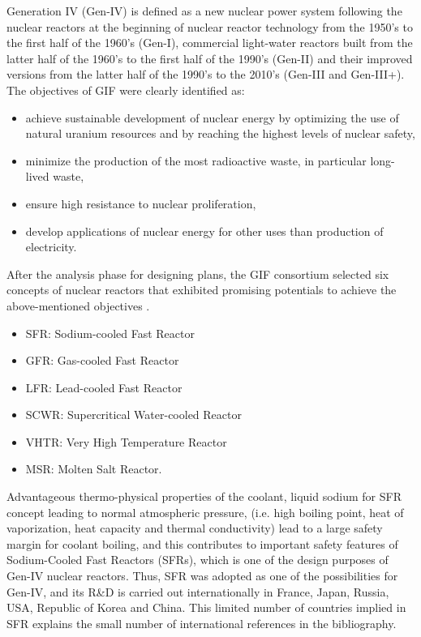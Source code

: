     Generation IV (Gen-IV) is defined as a new nuclear power system following the nuclear reactors at the beginning of nuclear reactor technology from the 1950's
to the first half of the 1960's (Gen-I), commercial light-water reactors built from the latter half of the 1960's to the first half of the 1990's (Gen-II) and their improved
versions from the latter half of the 1990's to the 2010's (Gen-III and Gen-III+). The objectives of GIF were clearly identified as:
    \begin{itemize}
     \item achieve sustainable development of nuclear energy by optimizing the use of natural uranium resources and by reaching the highest levels of nuclear safety,
     \item minimize the production of the most radioactive waste, in particular long-lived waste,
     \item ensure high resistance to nuclear proliferation,
     \item develop applications of nuclear energy for other uses than production of electricity.
    \end{itemize}
    After the analysis phase for designing plans, the GIF consortium selected six concepts of nuclear reactors that exhibited promising potentials to
achieve the above-mentioned objectives \parencite{GIF2014TechnologyRoadmapUpdate}.
    \begin{itemize}
     \item SFR: Sodium-cooled Fast Reactor
     \item GFR: Gas-cooled Fast Reactor
     \item LFR: Lead-cooled Fast Reactor
     \item SCWR: Supercritical Water-cooled Reactor
     \item VHTR: Very High Temperature Reactor
     \item MSR: Molten Salt Reactor.
    \end{itemize}
    Advantageous thermo-physical properties of the coolant, liquid sodium for SFR concept leading to normal atmospheric pressure, (i.e. high boiling point, heat of vaporization, heat capacity and thermal
conductivity) lead to a large safety margin for coolant boiling, and this contributes to important safety features of Sodium-Cooled Fast Reactors (SFRs), which
is one of the design purposes of Gen-IV nuclear reactors. Thus, SFR was adopted as one of the possibilities for Gen-IV, and its R\&D is carried out
internationally in France, Japan, Russia, USA, Republic of Korea and China. This limited number of countries implied in SFR explains the small number of international references
in the bibliography.

